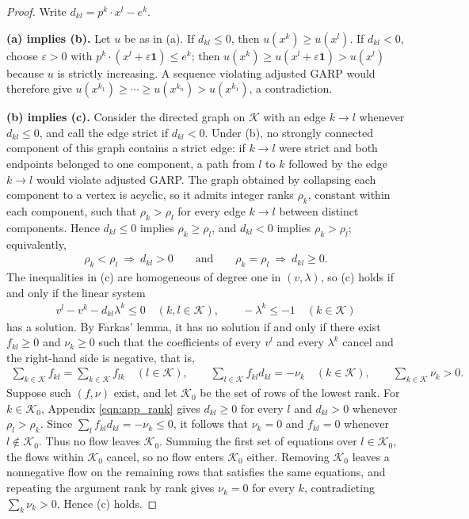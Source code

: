 \documentclass[11 pt]{article}
\begin{document}
\begin{proof}
Write $d_{kl} = p^{k} \cdot x^{l} - e^{k}$.

\textbf{(a) implies (b).} Let $u$ be as in (a). If $d_{kl} \leq 0$, then $u(x^{k}) \geq u(x^{l})$. If $d_{kl} < 0$, choose $\varepsilon > 0$ with $p^{k} \cdot (x^{l} + \varepsilon \mathbf{1}) \leq e^{k}$; then $u(x^{k}) \geq u(x^{l} + \varepsilon \mathbf{1}) > u(x^{l})$ because $u$ is strictly increasing. A sequence violating adjusted GARP would therefore give $u(x^{k_1}) \geq \cdots \geq u(x^{k_n}) > u(x^{k_1})$, a contradiction.

\textbf{(b) implies (c).} Consider the directed graph on $\mathcal{K}$ with an edge $k \to l$ whenever $d_{kl} \leq 0$, and call the edge strict if $d_{kl} < 0$. Under (b), no strongly connected component of this graph contains a strict edge: if $k \to l$ were strict and both endpoints belonged to one component, a path from $l$ to $k$ followed by the edge $k \to l$ would violate adjusted GARP. The graph obtained by collapsing each component to a vertex is acyclic, so it admits integer ranks $\rho_{k}$, constant within each component, such that $\rho_{k} > \rho_{l}$ for every edge $k \to l$ between distinct components. Hence $d_{kl} \leq 0$ implies $\rho_{k} \geq \rho_{l}$, and $d_{kl} < 0$ implies $\rho_{k} > \rho_{l}$; equivalently,
\begin{align}\label{eqn:app_rank}
\rho_{k} < \rho_{l} \ \Longrightarrow\ d_{kl} > 0
\qquad \text{and} \qquad
\rho_{k} = \rho_{l} \ \Longrightarrow\ d_{kl} \geq 0.
\end{align}
The inequalities in (c) are homogeneous of degree one in $(v, \lambda)$, so (c) holds if and only if the linear system
\begin{align*}
v^{l} - v^{k} - d_{kl} \lambda^{k} \leq 0 \quad (k, l \in \mathcal{K}), \qquad -\lambda^{k} \leq -1 \quad (k \in \mathcal{K})
\end{align*}
has a solution. By Farkas' lemma, it has no solution if and only if there exist $f_{kl} \geq 0$ and $\nu_{k} \geq 0$ such that the coefficients of every $v^{l}$ and every $\lambda^{k}$ cancel and the right-hand side is negative, that is,
\begin{align*}
\sum_{k \in \mathcal{K}} f_{kl} = \sum_{k \in \mathcal{K}} f_{lk} \quad (l \in \mathcal{K}), \qquad
\sum_{l \in \mathcal{K}} f_{kl} d_{kl} = -\nu_{k} \quad (k \in \mathcal{K}), \qquad
\sum_{k \in \mathcal{K}} \nu_{k} > 0.
\end{align*}
Suppose such $(f, \nu)$ exist, and let $\mathcal{K}_{0}$ be the set of rows of the lowest rank. For $k \in \mathcal{K}_{0}$, Appendix \autoref{eqn:app_rank} gives $d_{kl} \geq 0$ for every $l$ and $d_{kl} > 0$ whenever $\rho_{l} > \rho_{k}$. Since $\sum_{l} f_{kl} d_{kl} = -\nu_{k} \leq 0$, it follows that $\nu_{k} = 0$ and $f_{kl} = 0$ whenever $l \notin \mathcal{K}_{0}$. Thus no flow leaves $\mathcal{K}_{0}$. Summing the first set of equations over $l \in \mathcal{K}_{0}$, the flows within $\mathcal{K}_{0}$ cancel, so no flow enters $\mathcal{K}_{0}$ either. Removing $\mathcal{K}_{0}$ leaves a nonnegative flow on the remaining rows that satisfies the same equations, and repeating the argument rank by rank gives $\nu_{k} = 0$ for every $k$, contradicting $\sum_{k} \nu_{k} > 0$. Hence (c) holds.


\end{proof}
\end{document}
